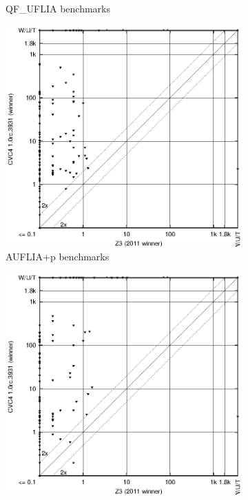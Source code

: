 \documentclass[twosize,11pt]{article}
\begin{document}
\begin{figure}[ht]
\begin{subfigure}{0.45\textwidth}
	   \caption{QF\_UFLIA benchmarks}
	\end{subfigure}	
\begin{subfigure}{0.45\textwidth}
	   \includegraphics[width=1\textwidth]{AUFLIA+p-scatter-improvement.eps}
	   \caption{AUFLIA+p benchmarks}
	\end{subfigure}	
\begin{subfigure}{0.45\textwidth}
	   \includegraphics[width=1\textwidth]{AUFLIA-p-scatter-improvement.eps}

\end{subfigure}
\end{figure}
\end{document}
